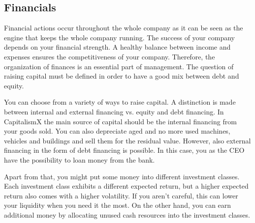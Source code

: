 \subsection{Financials} \label{finance_manual}

Financial actions occur throughout the whole company as it can be seen as the engine that keeps the whole company running. The success of your company depends on your financial strength. A healthy balance between income and expenses ensures the competitiveness of your company. Therefore, the organization of finances is an essential part of management. The question of raising capital must be defined in order to have a good mix between debt and equity.

You can choose from a variety of ways to raise capital. A distinction is made between internal and external financing vs. equity and debt financing.
In CapitalismX the main source of capital should be the internal financing from your goods sold. You can also depreciate aged and no more used machines, vehicles and buildings and sell them for the residual value. However, also external financing in the form of debt financing is possible. In this case, you as the CEO have the possibility to loan money from the bank.

Apart from that, you might put some money into different investment classes. Each investment class exhibits a different expected return, but a higher expected return also comes with a higher volatility. If you aren't careful, this can lower your liquidity when you need it the most. On the other hand, you can earn additional money by allocating unused cash resources into the investment classes.

